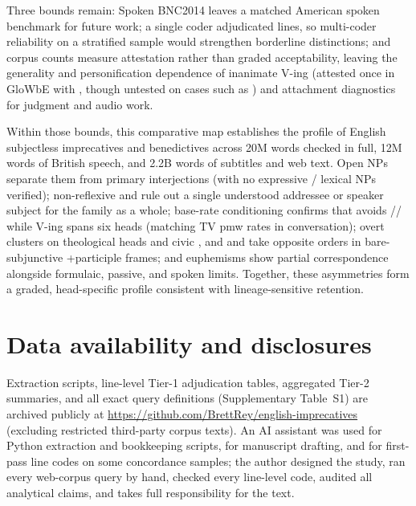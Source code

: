 \documentclass[12pt]{article}
\newif\ifblind
\begin{document}
Three bounds remain: Spoken BNC2014 leaves a matched American spoken benchmark for future work; a single coder adjudicated lines, so multi-coder reliability on a stratified sample would strengthen borderline distinctions; and corpus counts measure attestation rather than graded acceptability, leaving the generality and personification dependence of inanimate  V-ing (attested once in GloWbE with , though untested on cases such as ) and attachment diagnostics for judgment and audio work.

Within those bounds, this comparative map establishes the profile of English subjectless imprecatives and benedictives across 20M words checked in full, 12M words of British speech, and 2.2B words of subtitles and web text. Open NPs separate them from primary interjections (with no expressive / lexical NPs verified); non-reflexive  and  rule out a single understood addressee or speaker subject for the family as a whole; base-rate conditioning confirms that  avoids // while  V-ing spans six heads (matching TV pmw rates in conversation); overt  clusters on theological heads and civic , and  and  take opposite orders in bare-subjunctive +participle frames; and euphemisms show partial correspondence alongside formulaic, passive, and spoken limits. Together, these asymmetries form a graded, head-specific profile consistent with lineage-sensitive retention.

\section*{Data availability and disclosures}
\ifblind
Extraction scripts, line-level Tier-1 adjudication tables, parsed Tier-2 frequency summaries, and all exact query definitions (Supplementary Table~S1) will be archived in an anonymized repository for review and publicly upon acceptance, excluding restricted third-party corpus texts. An AI assistant was used for Python extraction and bookkeeping scripts, for manuscript drafting, and for first-pass line codes on some concordance samples; the author designed the study, ran every web-corpus query by hand, checked every line-level code, audited all analytical claims, and takes full responsibility for the text.
\else
Extraction scripts, line-level Tier-1 adjudication tables, aggregated Tier-2 summaries, and all exact query definitions (Supplementary Table~S1) are archived publicly at \url{https://github.com/BrettRey/english-imprecatives} (excluding restricted third-party corpus texts). An AI assistant was used for Python extraction and bookkeeping scripts, for manuscript drafting, and for first-pass line codes on some concordance samples; the author designed the study, ran every web-corpus query by hand, checked every line-level code, audited all analytical claims, and takes full responsibility for the text.
\fi

\clearpage
\printbibliography
\end{document}
